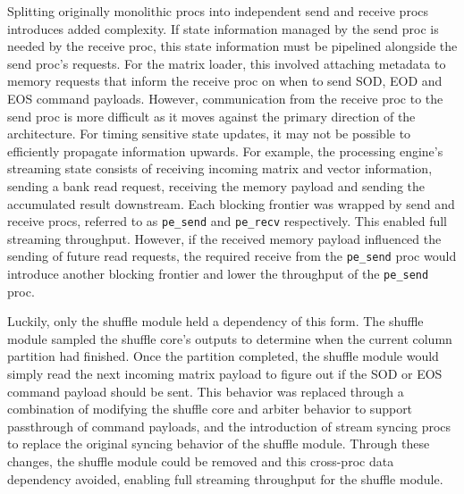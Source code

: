 
Splitting originally monolithic procs into independent send and receive procs introduces added complexity. If state information managed by the send proc is needed by the receive proc, this state information must be pipelined alongside the send proc's requests. For the matrix loader, this involved attaching metadata to memory requests that inform the receive proc on when to send SOD, EOD and EOS command payloads. However, communication from the receive proc to the send proc is more difficult as it moves against the primary direction of the architecture. For timing sensitive state updates, it may not be possible to efficiently propagate information upwards. For example, the processing engine's streaming state consists of receiving incoming matrix and vector information, sending a bank read request, receiving the memory payload and sending the accumulated result downstream. Each blocking frontier was wrapped by send and receive procs, referred to as \lstinline[style=mystyle]|pe_send| and \lstinline[style=mystyle]|pe_recv| respectively. This enabled full streaming throughput. However, if the received memory payload influenced the sending of future read requests, the required receive from the \lstinline[style=mystyle]|pe_send| proc would introduce another blocking frontier and lower the throughput of the \lstinline[style=mystyle]|pe_send| proc.

Luckily, only the shuffle module held a dependency of this form. The shuffle module sampled the shuffle core's outputs to determine when the current column partition had finished. Once the partition completed, the shuffle module would simply read the next incoming matrix payload to figure out if the SOD or EOS command payload should be sent. This behavior was replaced through a combination of modifying the shuffle core and arbiter behavior to support passthrough of command payloads, and the introduction of stream syncing procs to replace the original syncing behavior of the shuffle module. Through these changes, the shuffle module could be removed and this cross-proc data dependency avoided, enabling full streaming throughput for the shuffle module.

